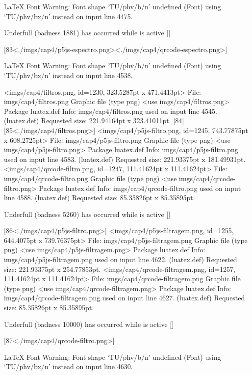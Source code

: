 LaTeX Font Warning: Font shape `TU/phv/b/n' undefined
(Font)              using `TU/phv/bx/n' instead on input line 4475.


Underfull \vbox (badness 1881) has occurred while \output is active []

[83<./imgs/cap4/p5js-espectro.png><./imgs/cap4/qrcode-espectro.png>]

LaTeX Font Warning: Font shape `TU/phv/b/n' undefined
(Font)              using `TU/phv/bx/n' instead on input line 4538.

<imgs/cap4/filtros.png, id=1230, 323.5287pt x 471.4413pt>
File: imgs/cap4/filtros.png Graphic file (type png)
<use imgs/cap4/filtros.png>
Package luatex.def Info: imgs/cap4/filtros.png  used on input line 4545.
(luatex.def)             Requested size: 221.94164pt x 323.41011pt.
[84] [85<./imgs/cap4/filtros.png>]
<imgs/cap4/p5js-filtro.png, id=1245, 743.77875pt x 608.2725pt>
File: imgs/cap4/p5js-filtro.png Graphic file (type png)
<use imgs/cap4/p5js-filtro.png>
Package luatex.def Info: imgs/cap4/p5js-filtro.png  used on input line 4583.
(luatex.def)             Requested size: 221.93375pt x 181.49931pt.
<imgs/cap4/qrcode-filtro.png, id=1247, 111.41624pt x 111.41624pt>
File: imgs/cap4/qrcode-filtro.png Graphic file (type png)
<use imgs/cap4/qrcode-filtro.png>
Package luatex.def Info: imgs/cap4/qrcode-filtro.png  used on input line 4588.
(luatex.def)             Requested size: 85.35826pt x 85.35895pt.

Underfull \vbox (badness 5260) has occurred while \output is active []

[86<./imgs/cap4/p5js-filtro.png>]
<imgs/cap4/p5js-filtragem.png, id=1255, 644.4075pt x 739.76375pt>
File: imgs/cap4/p5js-filtragem.png Graphic file (type png)
<use imgs/cap4/p5js-filtragem.png>
Package luatex.def Info: imgs/cap4/p5js-filtragem.png  used on input line 4622.
(luatex.def)             Requested size: 221.93375pt x 254.77853pt.
<imgs/cap4/qrcode-filtragem.png, id=1257, 111.41624pt x 111.41624pt>
File: imgs/cap4/qrcode-filtragem.png Graphic file (type png)
<use imgs/cap4/qrcode-filtragem.png>
Package luatex.def Info: imgs/cap4/qrcode-filtragem.png  used on input line 4627.
(luatex.def)             Requested size: 85.35826pt x 85.35895pt.

Underfull \vbox (badness 10000) has occurred while \output is active []

[87<./imgs/cap4/qrcode-filtro.png>]

LaTeX Font Warning: Font shape `TU/phv/b/n' undefined
(Font)              using `TU/phv/bx/n' instead on input line 4630.


